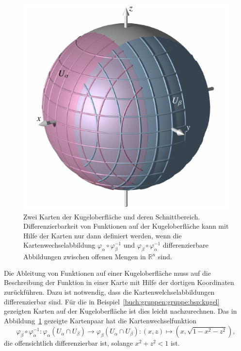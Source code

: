 \begin{beispiel}
\begin{figure}
\centering
\includegraphics{chapters/030-gruppen/images/kugelschnitt.pdf}
\caption{Zwei Karten der Kugeloberfläche und deren Schnittbereich.
Differenzierbarkeit von Funktionen auf der Kugeloberfläche kann mit
Hilfe der Karten nur dann definiert werden, wenn die Kartenwechselabbildung
$\varphi_\alpha\circ\varphi_\beta^{-1}$ und
$\varphi_\beta\circ\varphi_\alpha^{-1}$ differenzierbare Abbildungen
zwischen offenen Mengen in $\mathbb{R}^n$ sind.
\label{buch:gruppen:gruppe:fig:kugelkartenwechsel}}
\end{figure}
Die Ableitung von Funktionen auf einer Kugeloberfläche muss auf 
die Beschreibung der Funktion in einer Karte mit Hilfe der dortigen
Koordinaten zurückführen.
Dazu ist notwendig, dass die Kartenwelchselabbildungen differenzierbar
sind.
Für die in Beispiel~\ref{buch:gruppen:gruppe:bsp:kugel} gezeigten
Karten auf der Kugeloberfläche ist dies leicht nachzurechnen.
Das in Abbildung~\ref{buch:gruppen:gruppe:fig:kugelkartenwechsel} gezeigte
Kartenpaar hat die Kartenwechselfunktion
\[
\varphi_\beta
\circ
\varphi_\alpha^{-1}
\colon
\varphi_\alpha(U_\alpha\cap U_\beta)
\to
\varphi_\beta(U_\alpha\cap U_\beta)
:
(x,z) \mapsto (x,\!\sqrt{1-x^2-z^2}),
\]
die offensichtlich differenzierbar ist, solange $x^2+z^2<1$ ist.
\end{beispiel}

